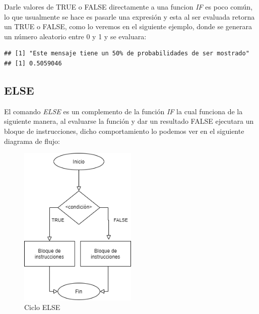 \documentclass[11pt,]{article}
\newenvironment{Shaded}{\begin{snugshade}}{\end{snugshade}}
\newcommand{\ControlFlowTok}[1]{\textcolor[rgb]{0.13,0.29,0.53}{\textbf{#1}}}
\newcommand{\DecValTok}[1]{\textcolor[rgb]{0.00,0.00,0.81}{#1}}
\newcommand{\FloatTok}[1]{\textcolor[rgb]{0.00,0.00,0.81}{#1}}
\newcommand{\KeywordTok}[1]{\textcolor[rgb]{0.13,0.29,0.53}{\textbf{#1}}}
\newcommand{\NormalTok}[1]{#1}
\newcommand{\OperatorTok}[1]{\textcolor[rgb]{0.81,0.36,0.00}{\textbf{#1}}}
\newcommand{\StringTok}[1]{\textcolor[rgb]{0.31,0.60,0.02}{#1}}
\begin{document}
Darle valores de TRUE o FALSE directamente a una funcion \emph{IF} es
poco común, lo que usualmente se hace es pasarle una expresión y esta al
ser evaluada retorna un TRUE o FALSE, como lo veremos en el siguiente
ejemplo, donde se generara un número aleatorio entre 0 y 1 y se
evaluara:

\begin{Shaded}
\end{Shaded}

\begin{verbatim}
## [1] "Este mensaje tiene un 50% de probabilidades de ser mostrado"
## [1] 0.5059046
\end{verbatim}

\hypertarget{else}{%
\subsection{ELSE}\label{else}}

El comando \emph{ELSE} es un complemento de la función \emph{IF} la cual
funciona de la siguiente manera, al evaluarse la función y dar un
resultado FALSE ejecutara un bloque de instrucciones, dicho
comportamiento lo podemos ver en el siguiente diagrama de flujo:

\begin{figure}
\hypertarget{id}{%
\centering
\includegraphics[width=0.5\textwidth,height=0.3\textheight]{../schemas/ELSE.png}
\caption{Ciclo ELSE}\label{id}
}
\end{figure}
\end{document}
